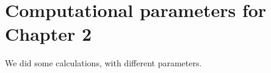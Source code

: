 \section{Computational parameters for Chapter 2} \label{app:comp_par_strain}
%
We did some calculations, with different parameters.